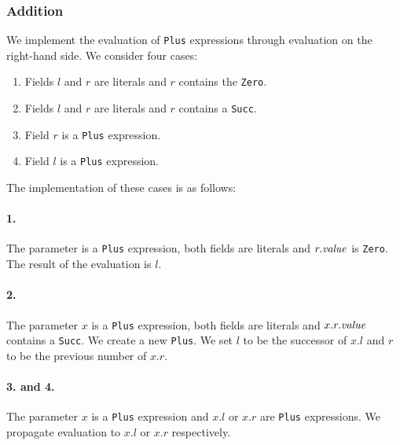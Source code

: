 \subsubsection{Addition}
We implement the evaluation of \texttt{Plus} expressions
through evaluation on the right-hand side.
We consider four cases:
\begin{enumerate}
  \item Fields $l$ and $r$ are literals and $r$ contains the  \texttt{Zero}.
  \item Fields $l$ and $r$ are literals and $r$ contains a  \texttt{Succ}.
  \item Field $r$ is a \texttt{Plus} expression.
  \item Field $l$ is a \texttt{Plus} expression.
\end{enumerate}
%
The implementation of these cases is as follows:
\paragraph{1.}
The parameter is a \texttt{Plus} expression,
both fields are literals and $r.\mathit{value}$ is \texttt{Zero}.
The result of the evaluation is $l$.

\paragraph{2.}
The parameter $x$ is a \texttt{Plus} expression,
both fields are literals and $x.r.\mathit{value}$ contains a \texttt{Succ}.
We create a new \texttt{Plus}.
We set $l$ to be the successor of $x.l$
and $r$ to be the previous number of $x.r$.

\paragraph{3. and 4.}
The parameter $x$ is a \texttt{Plus} expression
and $x.l$ or $x.r$ are \texttt{Plus} expressions.
We propagate evaluation to $x.l$ or $x.r$ respectively.


